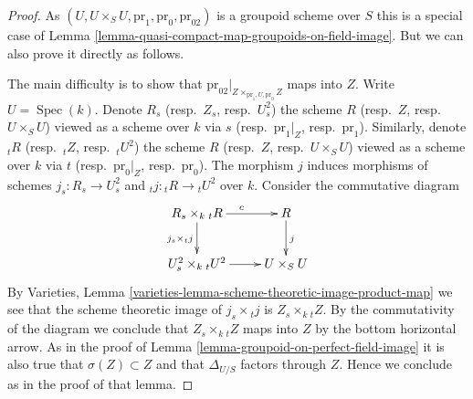 \documentclass{stacks-project}
\theoremstyle{plain}
\theoremstyle{definition}
\theoremstyle{remark}
\numberwithin{equation}{subsection}
\def\Spec{\mathop{\mathrm{Spec}}}
\begin{document}
\begin{proof}
As $(U, U \times_S U, \text{pr}_1, \text{pr}_0, \text{pr}_{02})$
is a groupoid scheme over $S$ this is a special case of
Lemma \ref{lemma-quasi-compact-map-groupoids-on-field-image}.
But we can also prove it directly as follows.

\medskip\noindent
The main difficulty is to show that
$\text{pr}_{02}|_{Z \times_{\text{pr}_1, U, \text{pr}_0} Z}$
maps into $Z$.
Write $U = \Spec(k)$. Denote
$R_s$ (resp.\ $Z_s$, resp.\ $U^2_s$) the scheme
$R$ (resp.\ $Z$, resp.\ $U \times_S U$) viewed as a scheme over $k$ via
$s$ (resp.\ $\text{pr}_1|_Z$, resp.\ $\text{pr}_1$).
Similarly, denote
${}_tR$ (resp.\ ${}_tZ$, resp.\ ${}_tU^2$) the scheme
$R$ (resp.\ $Z$, resp.\ $U \times_S U$) viewed as a scheme over $k$ via
$t$ (resp.\ $\text{pr}_0|_Z$, resp.\ $\text{pr}_0$).
The morphism $j$ induces morphisms of schemes
$j_s : R_s \to U^2_s$ and ${}_tj : {}_tR \to {}_tU^2$ over $k$.
Consider the commutative diagram
$$
\xymatrix{
R_s \times_k {}_tR \ar[r]^c \ar[d]_{j_s \times {}_tj} &  R \ar[d]^j \\
U^2_s \times_k {}_tU^2 \ar[r] & U \times_S U
}
$$
By
Varieties, Lemma \ref{varieties-lemma-scheme-theoretic-image-product-map}
we see that the scheme theoretic image of $j_s \times {}_tj$ is
$Z_s \times_k {}_tZ$. By the commutativity of the diagram we
conclude that $Z_s \times_k {}_tZ$ maps into $Z$ by the bottom
horizontal arrow. As in the proof of
Lemma \ref{lemma-groupoid-on-perfect-field-image}
it is also true that $\sigma(Z) \subset Z$ and that
$\Delta_{U/S}$ factors through $Z$. Hence we conclude as in the
proof of that lemma.
\end{proof}
\end{document}
